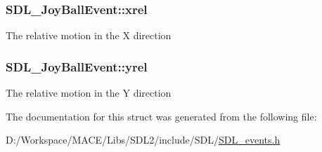 \subsubsection[{\texorpdfstring{xrel}{xrel}}]{ S\+D\+L\+\_\+\+Joy\+Ball\+Event\+::xrel}\hypertarget{struct_s_d_l___joy_ball_event_a959a8473aa1964e5e1778c27a9ffd261}{}\label{struct_s_d_l___joy_ball_event_a959a8473aa1964e5e1778c27a9ffd261}
The relative motion in the X direction 
\subsubsection[{\texorpdfstring{yrel}{yrel}}]{ S\+D\+L\+\_\+\+Joy\+Ball\+Event\+::yrel}\hypertarget{struct_s_d_l___joy_ball_event_a28ad48a9eb7a5d3ff62ccba09fcead76}{}\label{struct_s_d_l___joy_ball_event_a28ad48a9eb7a5d3ff62ccba09fcead76}
The relative motion in the Y direction 

The documentation for this struct was generated from the following file\+:\begin{DoxyCompactItemize}
\item 
D\+:/\+Workspace/\+M\+A\+C\+E/\+Libs/\+S\+D\+L2/include/\+S\+D\+L/\hyperlink{_s_d_l__events_8h}{S\+D\+L\+\_\+events.\+h}\end{DoxyCompactItemize}
